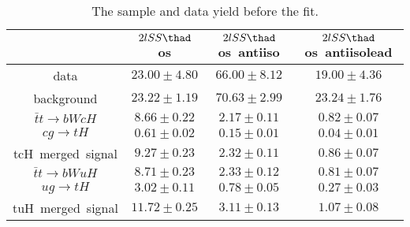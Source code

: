\begin{table}
\footnotesize
\caption{The sample and data yield before the fit.}
\centering
\begin{tabular}{|c|c|c|c|} \hline
 & $2lSS\thad$ os & $2lSS\thad$ os~antiiso & $2lSS\thad$ os~antiisolead\\\hline
data & $23.00\pm4.80$ & $66.00\pm8.12$ & $19.00\pm4.36$\\\hline
background & $23.22\pm1.19$ & $70.63\pm2.99$ & $23.24\pm1.76$\\\hline
$\bar{t}t\to bWcH$ & $8.66\pm0.22$ & $2.17\pm0.11$ & $0.82\pm0.07$\\\hline
$cg\to tH$ & $0.61\pm0.02$ & $0.15\pm0.01$ & $0.04\pm0.01$\\\hline
tcH~merged~signal & $9.27\pm0.23$ & $2.32\pm0.11$ & $0.86\pm0.07$\\\hline
$\bar{t}t\to bWuH$ & $8.71\pm0.23$ & $2.33\pm0.12$ & $0.81\pm0.07$\\\hline
$ug\to tH$ & $3.02\pm0.11$ & $0.78\pm0.05$ & $0.27\pm0.03$\\\hline
tuH~merged~signal & $11.72\pm0.25$ & $3.11\pm0.13$ & $1.07\pm0.08$\\\hline
\end{tabular}
\label{tab:yield}
\end{table}
